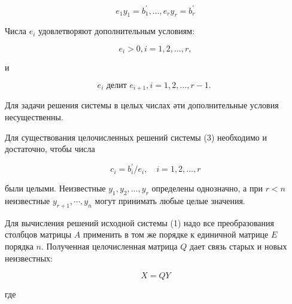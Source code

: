 \documentclass[10pt]{article}
\begin{document}
\[

e_{1} y_{1}=b_{1}^{\prime}, \ldots, e_{r} y_{r}=b_{r}^{\prime}

\]



Числа $e_{i}$ удовлетворяют дополнительным условиям:



\[

e_{i}>0, i=1,2, \ldots, r,

\]



и



\[

e_{i} \text { делит } e_{i+1}, i=1,2, \ldots, r-1 \text {. }

\]



Для задачи решения системы в целых числах әти дополнительные условия несущественны.



Для существования целочисленных решений системы (3) необходимо и достаточно, чтобы числа



\[

c_{i}=b_{i}^{\prime} / e_{i}, \quad i=1,2, \ldots, r

\]



были целыми. Неизвестные $y_{1}, y_{2}, \ldots, y_{r}$ определены однозначно, а при $r<n$ неизвестные $y_{r+1}, \cdots, y_{n}$ могут принимать любые целые значения.



Для вычисления решений исходной системы (1) надо все преобразования столбцов матрицы $A$ применить в том же порядке к единичной матрице $E$ порядка $n$. Полученная целочисленная матрица $Q$ дает связь старых и новых неизвестных:



\[

X=Q Y

\]



где
\end{document}
